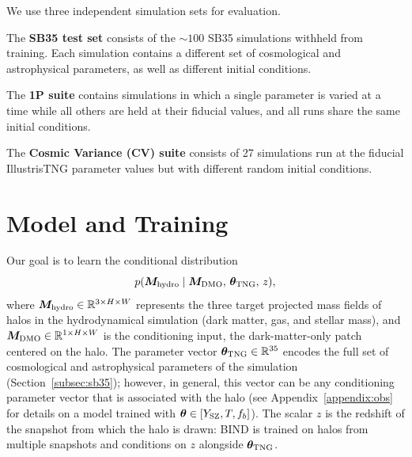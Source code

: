\documentclass[linenumbers,trackchanges, twocolumn]{aastex701}
\begin{document}
We use three independent simulation sets for evaluation.

The \textbf{SB35 test set} consists of the ${\sim}100$ SB35 simulations withheld from training. Each simulation contains a different set of cosmological and astrophysical parameters, as well as different initial conditions.

The \textbf{1P suite} contains simulations in which a single parameter is varied at a time while all others are held at their fiducial values, and all runs share the same initial conditions. 

The \textbf{Cosmic Variance (CV) suite} consists of 27 simulations run at the fiducial IllustrisTNG parameter values but with different random initial conditions.


\section{Model and Training}
\label{sec:model}

Our goal is to learn the conditional distribution
\begin{equation}
    p(\bm{M}_{\rm hydro} \mid \bm{M}_{\rm DMO},\,
    \boldsymbol{\theta}_{\rm TNG},\, z),
    \label{eq:target_distribution}
\end{equation}
where $\bm{M}_{\rm hydro} \in \mathbb{R}^{3 \times H \times W}$ represents the three target projected mass fields of halos in the hydrodynamical simulation (dark matter, gas, and stellar mass), and $\bm{M}_{\rm DMO} \in \mathbb{R}^{1 \times H \times W}$ is the conditioning input, the dark-matter-only patch centered on the halo. The parameter vector $\boldsymbol{\theta}_{\rm TNG} \in \mathbb{R}^{35}$ encodes the full set of cosmological and astrophysical parameters of the simulation (Section~\ref{subsec:sb35}); however, in general, this vector can be any conditioning parameter vector that is associated with the halo (see Appendix~\ref{appendix:obs} for details on a model trained with $\boldsymbol{\theta}\in [Y_{\rm SZ}, T, f_b]$). The scalar $z$ is the redshift of the snapshot from which the halo is drawn: \textsc{BIND} is trained on halos from multiple snapshots and conditions on $z$ alongside $\boldsymbol{\theta}_{\rm TNG}$.
\end{document}
